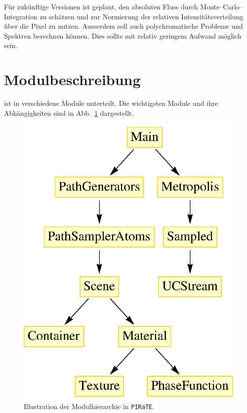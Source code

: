 	Für zukünftige Versionen ist geplant, den absoluten Fluss durch Monte--Carlo--Integration zu schätzen und zur Normierung der relativen Intensitätsverteilung über die Pixel zu nutzen. Ausserdem soll \pirate auch polychromatische Probleme und Spektren berechnen können. Dies sollte mit relativ geringem Aufwand möglich sein.
	
	\section{Modulbeschreibung}
	
	\pirate ist in verschiedene Module unterteilt. Die wichtigsten Module und ihre Abhängigkeiten sind in Abb.~\ref{fig:moduleoverview} dargestellt.
		\begin{figure}
				\centering
				\includegraphics[height=0.3\textheight]{moduleoverview.eps}
				\caption{Illustration der Modulhierarchie in \texttt{PIRaTE}.}
				\label{fig:moduleoverview}
		\end{figure}
